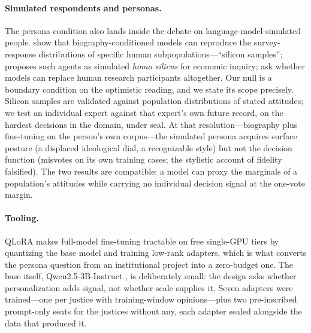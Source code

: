 \paragraph{Simulated respondents and personas.}
The persona condition also lands inside the debate on
language-model-simulated people. \citet{argyle2023} show that
biography-conditioned models can reproduce the survey-response
distributions of specific human subpopulations---``silicon
samples''; \citet{horton2023} proposes such agents as simulated
\emph{homo silicus} for economic inquiry; \citet{dillion2023} ask
whether models can replace human research participants altogether.
Our null is a boundary condition on the optimistic reading, and we
state its scope precisely. Silicon samples are validated against
population distributions of stated attitudes; we test an individual
expert against that expert's own future record, on the hardest
decisions in the domain, under seal. At that resolution---biography
plus fine-tuning on the person's own corpus---the simulated persona
acquires surface posture (a displaced ideological dial, a
recognizable style) but not the decision function (misvotes on its
own training cases; the stylistic account of fidelity falsified).
The two results are compatible: a model can proxy the marginals of a
population's attitudes while carrying no individual decision signal
at the one-vote margin.

\paragraph{Tooling.}
QLoRA \citep{dettmers2023} makes full-model fine-tuning tractable on
free single-GPU tiers by quantizing the base model and training
low-rank adapters, which is what converts the persona question from
an institutional project into a zero-budget one. The base itself,
Qwen2.5-3B-Instruct \citep{qwen25}, is deliberately small: the
design asks whether personalization adds signal, not whether scale
supplies it. Seven adapters were trained---one per justice with
training-window opinions---plus two pre-inscribed prompt-only seats
for the justices without any, each adapter sealed alongside the data
that produced it.

